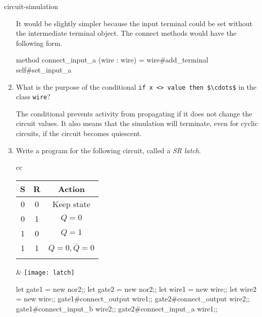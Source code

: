 \begin{exercise}{circuit-simulation}
\begin{enumerate}
\begin{answer}\ifanswers
It would be slightly simpler because the input terminal could be set without the intermediate terminal object.
The connect methods would have the following form.

\begin{ocaml}
   method connect_input_a (wire : wire) =
      wire#add_terminal self#set_input_a
\end{ocaml}
\fi\end{answer}

\item
What is the purpose of the conditional \hbox{\lstinline/if x <> value then $\cdots$/} in the class \hbox{\lstinline/wire/}?

\begin{answer}\ifanswers
The conditional prevents activity from propagating if it does not change the circuit values.
It also means that the simulation will terminate, even for cyclic circuits, if the circuit becomes quiescent.
\fi\end{answer}

\item
Write a program for the following circuit, called a \emph{SR latch}.
\begin{center}
\begin{tabular}{cc}
\begin{tabular}[b]{cc|c}
S & R & Action\\
\hline
0 & 0 & Keep state\\
0 & 1 & $Q = 0$\\
1 & 0 & $Q = 1$\\
1 & 1 & $Q = 0, \overline{Q} = 0$\\
\\
\end{tabular}
&
\texttt{[image: latch]}
\end{tabular}
\end{center}

\begin{answer}\ifanswers
\begin{ocaml}
let gate1 = new nor2;;
let gate2 = new nor2;;
let wire1 = new wire;;
let wire2 = new wire;;
gate1#connect_output wire1;;
gate2#connect_output wire2;;
gate1#connect_input_b wire2;;
gate2#connect_input_a wire1;;
\end{ocaml}
\fi\end{answer}
\end{enumerate}
\end{exercise}
   
